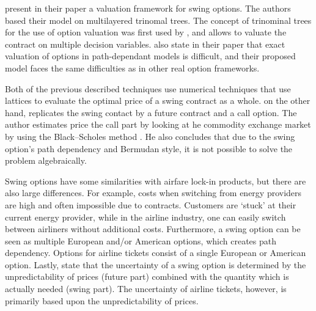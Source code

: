  present in their paper a valuation framework for swing options. The authors based their model on multilayered trinomal trees. The concept of trinominal trees for the use of option valuation was first used by , and allows to valuate the contract on multiple decision variables.  also state in their paper that exact valuation of options in path-dependant models is difficult, and their proposed model faces the same difficulties as in other real option frameworks.

Both of the previous described techniques use numerical techniques that use lattices to evaluate the optimal price of a swing contract as a whole. \cite{keppo2004pricing} on the other hand, replicates the swing contact by a future contract and a call option. The author estimates price the call part by looking at he commodity exchange market by using the Black--Scholes method \cite{black1976pricing}. He also concludes that due to the swing option's path dependency and Bermudan style, it is not possible to solve the problem algebraically.

Swing options have some similarities with airfare lock-in products, but there are also large differences. For example, costs when switching from energy providers are high and often impossible due to contracts. Customers are `stuck' at their current energy provider, while in the airline industry, one can easily switch between airliners without additional costs. Furthermore, a swing option can be seen as multiple European and/or American options, which creates path dependency. Options for airline tickets consist of a single European or American option. Lastly,  state that the uncertainty of a swing option is determined by the unpredictability of prices (future part) combined with the quantity which is actually needed (swing part). The uncertainty of airline tickets, however, is primarily based upon the unpredictability of prices.

